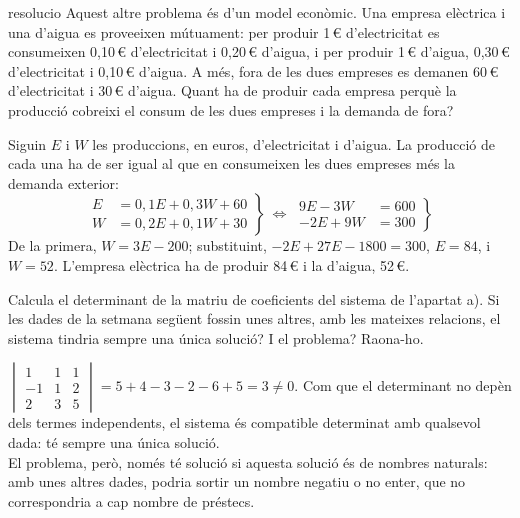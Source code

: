 \begin{apartats}
\begin{tria}{resolucio}
Aquest altre problema és d'un model econòmic. Una empresa elèctrica i una d'aigua es proveeixen
mútuament: per produir 1\,€ d'electricitat es consumeixen 0,10\,€ d'electricitat i 0,20\,€ d'aigua, i
per produir 1\,€ d'aigua, 0,30\,€ d'electricitat i 0,10\,€ d'aigua. A més, fora de les dues empreses es
demanen 60\,€ d'electricitat i 30\,€ d'aigua. Quant ha de produir cada empresa perquè la producció
cobreixi el consum de les dues empreses i la demanda de fora?

\begin{solucio}
Siguin $E$ i $W$ les produccions, en euros, d'electricitat i d'aigua. La producció de cada una ha de ser
igual al que en consumeixen les dues empreses més la demanda exterior:
\[
\left.\begin{aligned}E&=0{,}1E+0{,}3W+60\\W&=0{,}2E+0{,}1W+30\end{aligned}\right\}
\ \Longleftrightarrow\
\left.\begin{aligned}9E-3W&=600\\-2E+9W&=300\end{aligned}\right\}
\]
De la primera, $W=3E-200$; substituint, $-2E+27E-1800=300$, $E=84$, i $W=52$. L'empresa elèctrica ha
de produir 84\,€ i la d'aigua, 52\,€.
\end{solucio}
\end{tria}

\begin{nomesllarg}
Calcula el determinant de la matriu de coeficients del sistema de l'apartat a). Si les dades de la
setmana següent fossin unes altres, amb les mateixes relacions, el sistema tindria sempre una única
solució? I el problema? Raona-ho.

\begin{solucio}
$\begin{vmatrix}1&1&1\\-1&1&2\\2&3&5\end{vmatrix}=5+4-3-2-6+5=3\ne0$. Com que el determinant no depèn dels
termes independents, el sistema és compatible determinat amb qualsevol dada: té sempre una única
solució.\\
El problema, però, només té solució si aquesta solució és de nombres naturals: amb unes altres dades,
podria sortir un nombre negatiu o no enter, que no correspondria a cap nombre de préstecs.
\end{solucio}
\end{nomesllarg}

\end{apartats}
